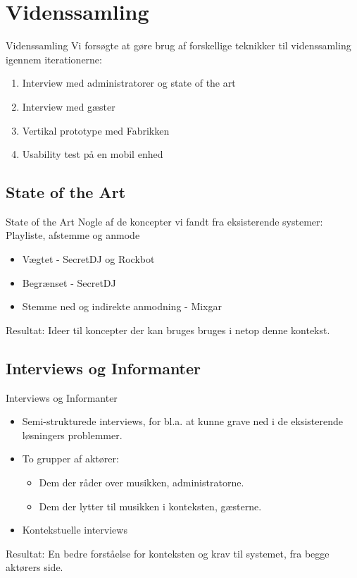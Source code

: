 \section{Videnssamling}
\begin{frame}{Videnssamling}
Vi forsøgte at gøre brug af forskellige teknikker til videnssamling igennem iterationerne:
\begin{enumerate}
\item Interview med administratorer og state of the art
\item Interview med gæster
\item Vertikal prototype med Fabrikken
\item Usability test på en mobil enhed
\end{enumerate}
\end{frame}

\subsection{State of the Art}
\begin{frame}{State of the Art}
	Nogle af de koncepter vi fandt fra eksisterende systemer:
	Playliste, afstemme og anmode
	\begin{itemize}
	\item Vægtet - SecretDJ og Rockbot
	\item Begrænset - SecretDJ
	\item Stemme ned og indirekte anmodning - Mixgar
	\end{itemize}

	Resultat: Ideer til koncepter der kan bruges bruges i netop denne kontekst.
\end{frame}
\subsection{Interviews og Informanter}
\begin{frame}{Interviews og Informanter}
	\begin{itemize}
	\item Semi-strukturede interviews, for bl.a. at kunne grave ned i de eksisterende løsningers problemmer.

	\item To grupper af aktører:
	\begin{itemize}
		\item Dem der råder over musikken, administratorne.
		\item Dem der lytter til musikken i konteksten, gæsterne.
	\end{itemize}

	\item Kontekstuelle interviews
	\end{itemize}
	Resultat: En bedre forståelse for konteksten og krav til systemet, fra begge aktørers side.
\end{frame}
